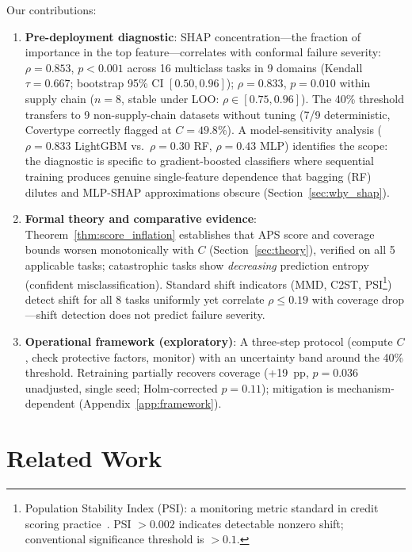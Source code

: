 \documentclass{uai2026} %
\begin{document}
Our contributions:

\begin{enumerate}
    \item \textbf{Pre-deployment diagnostic}: SHAP concentration---the fraction of importance in the top feature---correlates with conformal failure severity: $\rho = 0.853$, $p < 0.001$ across 16 multiclass tasks in 9 domains (Kendall $\tau = 0.667$; bootstrap 95\% CI $[0.50, 0.96]$); $\rho = 0.833$, $p = 0.010$ within supply chain ($n=8$, stable under LOO: $\rho \in [0.75, 0.96]$). The 40\% threshold transfers to 9 non-supply-chain datasets without tuning (7/9 deterministic, Covertype correctly flagged at $C=49.8\%$). A model-sensitivity analysis ($\rho=0.833$ LightGBM vs.\ $\rho=0.30$ RF, $\rho=0.43$ MLP) identifies the scope: the diagnostic is specific to gradient-boosted classifiers where sequential training produces genuine single-feature dependence that bagging (RF) dilutes and MLP-SHAP approximations obscure (Section~\ref{sec:why_shap}).

    \item \textbf{Formal theory and comparative evidence}: Theorem~\ref{thm:score_inflation} establishes that APS score and coverage bounds worsen monotonically with $C$ (Section~\ref{sec:theory}), verified on all 5 applicable tasks; catastrophic tasks show \textit{decreasing} prediction entropy (confident misclassification). Standard shift indicators (MMD, C2ST, PSI\footnote{Population Stability Index (PSI): a monitoring metric standard in credit scoring practice~\citep{siddiqi2006credit}. PSI $>0.002$ indicates detectable nonzero shift; conventional significance threshold is $>0.1$.}) detect shift for all 8 tasks uniformly yet correlate $\rho \leq 0.19$ with coverage drop---shift detection does not predict failure severity.

    \item \textbf{Operational framework (exploratory)}: A three-step protocol (compute $C$, check protective factors, monitor) with an uncertainty band around the 40\% threshold. Retraining partially recovers coverage (+19~pp, $p=0.036$ unadjusted, single seed; Holm-corrected $p=0.11$); mitigation is mechanism-dependent (Appendix~\ref{app:framework}).
\end{enumerate}

\section{Related Work}\label{sec:related}
\end{document}
